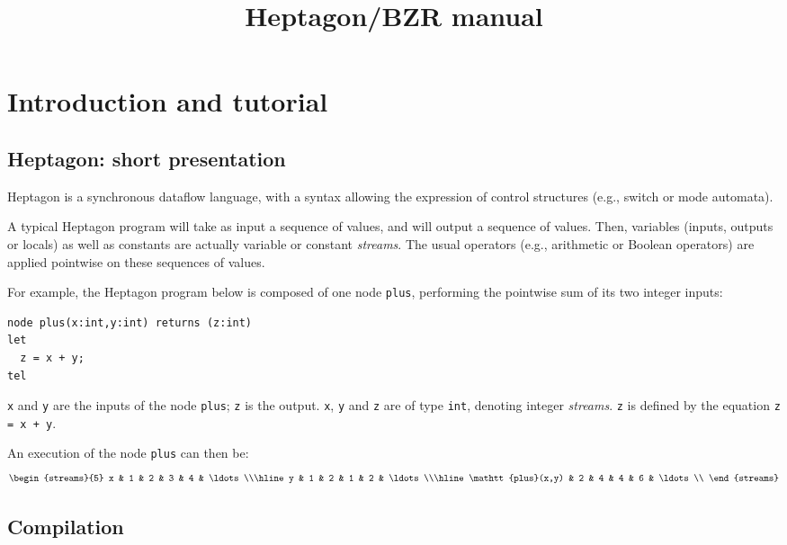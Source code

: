 \documentclass[a4paper]{article}
\title{Heptagon/BZR manual}
\author{}
\begin{document}
\maketitle

\section{Introduction and tutorial}
\label{sec:intro}

\subsection{Heptagon: short presentation}
\label{sec:hept-short-pres}

Heptagon is a synchronous dataflow language, with a syntax allowing the
expression of control structures (e.g., switch or mode automata).

A typical Heptagon program will take as input a sequence of values, and will
output a sequence of values. Then, variables (inputs, outputs or locals) as well
as constants are actually variable or constant \emph{streams}. The usual
operators (e.g., arithmetic or Boolean operators) are applied pointwise on these
sequences of values.

For example, the Heptagon program below is composed of one node \texttt{plus},
performing the pointwise sum of its two integer inputs:

\begin{lstlisting}
node plus(x:int,y:int) returns (z:int)
let
  z = x + y;
tel
\end{lstlisting}

\texttt{x} and \texttt{y} are the inputs of the node \texttt{plus}; \texttt{z}
is the output. \texttt{x}, \texttt{y} and \texttt{z} are of type \texttt{int},
denoting integer \emph{streams}. \texttt{z} is defined by the equation
\lstinline|z = x + y|.

An execution of the node \texttt{plus} can then be:
\[
\begin{streams}{5}
  x & 1 & 2 & 3 & 4 & \ldots\\\hline
  y & 1 & 2 & 1 & 2 & \ldots\\\hline
  \mathtt{plus}(x,y) & 2 & 4 & 4 & 6 & \ldots\\
\end{streams}
\]

\subsection{Compilation}
\label{sec:compilation}
\end{document}
